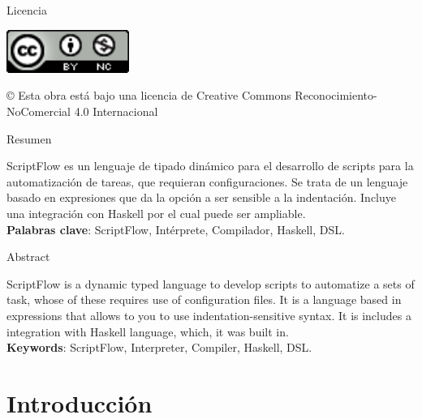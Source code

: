 \documentclass[11pt]{article}
\begin{document}
\newpage
\begin{flushleft}
  {\huge  Licencia }\\[2ex]
\end{flushleft}

\begin{center}
  \includegraphics[width=40mm]{license.png}\\[4ex]
\end{center}
© Esta obra está bajo una licencia de Creative Commons Reconocimiento-NoComercial 4.0 Internacional

\newpage
\begin{center}
  {\huge  Resumen }\\[2ex]
\end{center}

{\fontsize{14}{11}\selectfont
   ScriptFlow es un lenguaje de tipado dinámico para el desarrollo de scripts para la automatización de tareas, que requieran configuraciones.
   Se trata de un lenguaje basado en expresiones que da la opción a ser sensible a la indentación. Incluye una integración con Haskell por el
   cual puede ser ampliable.
}\\
\vspace{50mm}
\textbf{Palabras clave}: ScriptFlow, Intérprete, Compilador, Haskell, DSL.

\newpage
\begin{center}
  {\huge  Abstract }\\[2ex]
\end{center}

{\fontsize{14}{11}\selectfont
   ScriptFlow is a dynamic typed language to develop scripts to automatize a sets of task, whose of these requires use of configuration files.
   It is a language based in expressions that allows to you to use indentation-sensitive syntax. It is includes a integration with Haskell language,
   which, it was built in.
}\\
\vspace{50mm}
\textbf{Keywords}: ScriptFlow, Interpreter, Compiler, Haskell, DSL.

\newpage

\renewcommand{\contentsname}{Índice general}

\tableofcontents

\newpage


\section{Introducción}
\label{sec:org88f98b8}
\end{document}

